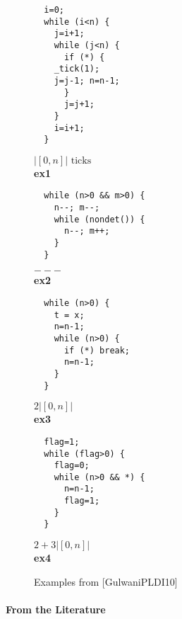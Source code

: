 \documentclass[nocopyrightspace,preprint]{sigplanconf}
\begin{document}
\begin{figure*}[t!]
 \setlength{\progwidth}{.24\linewidth}
  \centering
%
%
  \begin{minipage}[b]{\progwidth}
    \begin{center}
   \begin{lstlisting}
  i=0;
  while (i<n) {
    j=i+1;
    while (j<n) {
      if (*) {
	_tick(1);
	j=j-1; n=n-1;
      }
      j=j+1;
    }
    i=i+1;
  }
   \end{lstlisting}
$|[0, n]| \text{ ticks}$
\\[.7\baselineskip]
      {\bf ex1}
    \end{center}
  \end{minipage}
%
%
  \begin{minipage}[b]{\progwidth}
    \begin{center}
   \begin{lstlisting}
  while (n>0 && m>0) {
    n--; m--;
    while (nondet()) {
      n--; m++;
    }
  }
   \end{lstlisting}
$---$
\\[.7\baselineskip]
      {\bf ex2}
    \end{center}
  \end{minipage}
%
%
  \begin{minipage}[b]{\progwidth}
    \begin{center}
   \begin{lstlisting}
  while (n>0) {
    t = x;
    n=n-1;
    while (n>0) {
      if (*) break;
      n=n-1;
    }
  }
   \end{lstlisting}
$2 |[0, n]|$
\\[.7\baselineskip]
      {\bf ex3}
    \end{center}
  \end{minipage}
%
%
  \begin{minipage}[b]{\progwidth}
    \begin{center}
   \begin{lstlisting}
  flag=1;
  while (flag>0) {
    flag=0;
    while (n>0 && *) {
      n=n-1;       
      flag=1;
    }
  }
   \end{lstlisting}
$2 + 3|[0, n]|$
\\[.7\baselineskip]
      {\bf ex4}
    \end{center}
  \end{minipage}


   \caption{Examples from [GulwaniPLDI10]}
  \label{fig:cat3a}
\end{figure*}


\paragraph{From  the Literature}
\end{document}
